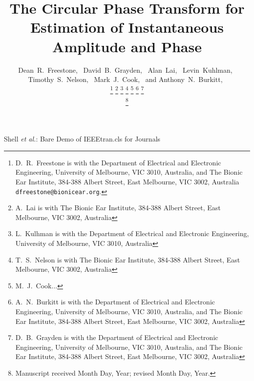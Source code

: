 \documentclass[journal,11pt,a4paper,onecolumn,draftcls]{IEEEtran}
\begin{document}
\title{The Circular Phase Transform for Estimation of Instantaneous Amplitude and Phase}

\author{Dean~R.~Freestone,~
		David~B.~Grayden,~
        Alan~Lai,~
        Levin~Kuhlman,~
        Timothy~S.~Nelson,~
        Mark~J.~Cook,~
        and Anthony~N.~Burkitt,~
        

\thanks{D.\ R.\ Freestone is with the Department
of Electrical and Electronic Engineering, University of Melbourne, VIC 3010, Australia, and The Bionic Ear Institute, 384-388 Albert Street, East Melbourne, VIC 3002, Australia {\tt\small dfreestone@bionicear.org}.}  %
\thanks{A.\ Lai is with The Bionic Ear Institute, 384-388 Albert Street, East Melbourne, VIC 3002, Australia}
\thanks{L.\ Kulhman is with the Department of Electrical and Electronic Engineering, University of Melbourne, VIC 3010, Australia}
\thanks{T.\ S.\ Nelson is with The Bionic Ear Institute, 384-388 Albert Street, East Melbourne, VIC 3002, Australia}
\thanks{M.\ J.\ Cook...}
\thanks{A.\ N.\ Burkitt is with the Department of Electrical and Electronic Engineering, University of Melbourne, VIC 3010, Australia, and The Bionic Ear Institute, 384-388 Albert Street, East Melbourne, VIC 3002, Australia}
\thanks{D.\ B.\ Grayden is with the Department of Electrical and Electronic Engineering, University of Melbourne, VIC 3010, Australia, and The Bionic Ear Institute, 384-388 Albert Street, East Melbourne, VIC 3002, Australia}

\thanks{Manuscript received Month Day, Year; revised Month Day, Year.}}


%
{Shell \MakeLowercase{\textit{et al.}}: Bare Demo of IEEEtran.cls for Journals}

\maketitle
\end{document}
